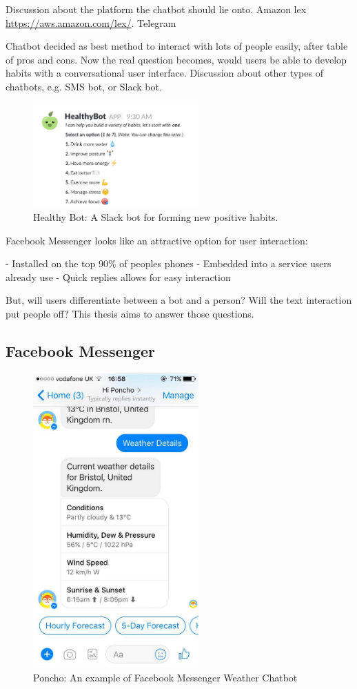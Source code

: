 Discussion about the platform the chatbot should lie onto. Amazon lex \url{https://aws.amazon.com/lex/}. Telegram


Chatbot decided as best method to interact with lots of people easily, after table of pros and cons. Now the real question becomes, would users be able to develop habits with a conversational user interface. Discussion about other types of chatbots, e.g. SMS bot, or Slack bot.

\begin{figure}[H] %
    \centering
    \includegraphics[width=2.5in]{../resources/existing-bots/healthy-bot.png}
    \caption{Healthy Bot: A Slack bot for forming new positive habits.}
    \label{fig:poncho}
\end{figure}

Facebook Messenger looks like an attractive option for user interaction:

- Installed on the top 90\% of peoples phones
- Embedded into a service users already use
- Quick replies allows for easy interaction

But, will users differentiate between a bot and a person? Will the text interaction put people off? This thesis aims to answer those questions.

\subsection{Facebook Messenger}

\begin{figure}[H] %
    \centering
    \includegraphics[width=2.5in]{../resources/existing-bots/poncho.jpg}
    \caption{Poncho: An example of Facebook Messenger Weather Chatbot}
    \label{fig:poncho}
\end{figure}

